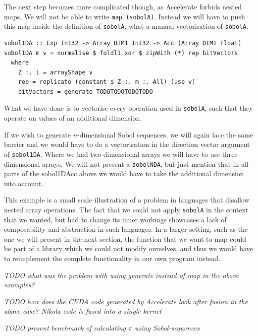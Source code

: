\documentclass{llncs2e/llncs}
\begin{document}
The next step becomes more complicated though, as Accelerate forbids
nested maps. We will not be able to write \verb|map (sobolA)|.
Instead we will have to push this map inside the definition of
\verb|sobolA|, what a manual vectorisation of \verb|sobolA|.
\begin{verbatim}
sobol1DA :: Exp Int32 -> Array DIM1 Int32 -> Acc (Array DIM1 Float)
sobol1DA m v = normalise $ foldl1 xor $ zipWith (*) rep bitVectors
  where
    Z :. i = arrayShape v
    rep = replicate (constant $ Z :. m :. All) (use v)
    bitVectors = generate TODOTODOTODOTODO
\end{verbatim}
What we have done is to vectorise every operation used in
\verb|sobolA|, such that they operate on values of an additional
dimension.

If we wish to generate $n$-dimensional Sobol sequences, we will again
face the same barrier and we would have to do a vectorisation in the
direction vector argument of \verb|sobol1DA|. Where we had two
dimensional arrays we will have to use three dimensional arrays. We
will not present a \verb|sobolNDA|, but just mention that in all
parts of the sobol1DAcc above we would have to take the additional
dimension into account.

This example is a small scale illustration of a problem in languages
that disallow nested array operations. The fact that we could not
apply \verb|sobolA| in the context that we wanted, but had to change
its inner workings showcases a lack of composability and abstraction
in such languages. In a larger setting, such as the one we will
present in the next section, the function that we want to map could be
part of a library which we could not modify ourselves, and thus we
would have to reimplement the complete functionality in our own
program instead.

\emph{TODO what was the problem with using generate instead of map in the
above examples?}

\emph{TODO how does the CUDA code generated by Accelerate look after
  fusion in the above case? Nikola code is fused into a single kernel}

\emph{TODO present benchmark of calculating $\pi$ using Sobol-sequences}
\end{document}
